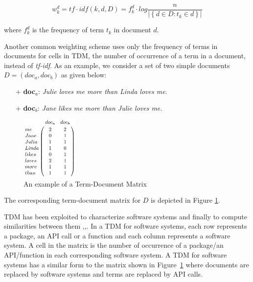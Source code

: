 \begin{equation} \label{tfidf} %
w_{k}^{d} =tf\cdot idf(k,d,D)= f_{k}^{d}\cdot log\frac{n}{\left | \left \{ d\in D: t_{k} \in d \right \} \right |} 
\end{equation}

where $f_{k}^{d}$ is the frequency of term $t_{k}$ in document $d$.

Another common weighting scheme uses only the frequency of terms in documents for cells in TDM, \ie the number of occurrence of a term in a document, instead of {\em tf-idf}. As an example, we consider a set of two simple documents $D=(doc_{a},doc_{b})$ as given below:

\begin{itemize}
	\item[+] \textbf{doc}$_a$: \emph{Julie loves me more than Linda loves me.}
	\item[+] \textbf{doc}$_b$: \emph{Jane likes me more than Julie loves me.}
\end{itemize}

\begin{figure}
	\centering
	\includegraphics[width=0.25\textwidth]{images/TDMExample.pdf}
	\caption{An example of a Term-Document Matrix}
	\label{fig:TDMExample}
\end{figure}

The corresponding term-document matrix for $D$ is depicted in Figure \ref{fig:TDMExample}.


TDM has been exploited to characterize software systems and finally to compute similarities between them \cite{10.1109/APSEC.2004.69},\cite{10.1109ICPC.2016.7503721},\cite{McMillan:2012:DSS:2337223.2337267}. In a TDM for software systems, each row represents a package, an API call or a function and each column represents a software system. A cell in the matrix is the number of occurrence of a package/an API/function in each corresponding software system. A TDM for software systems has a similar form to the matrix shown in Figure~\ref{fig:TDMExample} where documents are replaced by software systems and terms are replaced by API calls.


